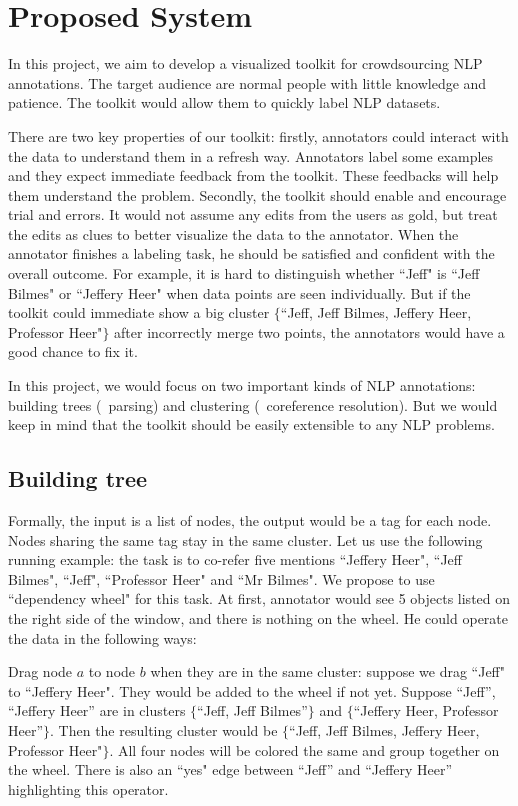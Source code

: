\section{Proposed System}

In this project, we aim to develop a visualized toolkit for
crowdsourcing NLP annotations. The target audience are normal people
with little knowledge and patience. The toolkit would allow them to
quickly label NLP datasets.

There are two key properties of our toolkit: firstly, annotators could
interact with the data to understand them in a refresh way. Annotators
label some examples and they expect immediate feedback from the
toolkit. These feedbacks will help them understand the problem.
Secondly, the toolkit should enable and encourage trial and errors. It
would not assume any edits from the users as gold, but treat the edits
as clues to better visualize the data to the annotator. When the
annotator finishes a labeling task, he should be satisfied and
confident with the overall outcome. For example, it is hard to
distinguish whether ``Jeff" is ``Jeff Bilmes" or ``Jeffery Heer" when
data points are seen individually. But if the toolkit could immediate
show a big cluster $\{$``Jeff, Jeff Bilmes, Jeffery Heer, Professor
Heer"$\}$ after incorrectly merge two points, the annotators would
have a good chance to fix it.

In this project, we would focus on two important kinds of NLP
annotations: building trees (\eg\  parsing) and clustering (\eg\
coreference resolution). But we would keep in mind that the toolkit
should be easily extensible to any NLP problems. 

\subsection{Building tree}

Formally, the input is a list of nodes, the output would be a tag for
each node. Nodes sharing the same tag stay in the same cluster. Let us
use the following running example: the task is to co-refer five
mentions ``Jeffery Heer", ``Jeff Bilmes", ``Jeff", ``Professor Heer"
and ``Mr Bilmes". We propose to use ``dependency wheel" for this task.
At first, annotator would see 5 objects listed on the right side of
the window, and there is nothing on the wheel. He could operate the
data in the following ways:

Drag node $a$ to node $b$ when they are in the same cluster: suppose
we drag ``Jeff" to ``Jeffery Heer". They would be added to the wheel
if not yet. Suppose ``Jeff'', ``Jeffery Heer'' are in clusters
  $\{$``Jeff, Jeff Bilmes''$\}$ and $\{$``Jeffery Heer, Professor
  Heer''$\}$. Then the resulting cluster would be $\{$``Jeff, Jeff
  Bilmes, Jeffery Heer, Professor Heer"$\}$. All four nodes will be
  colored the same and group together on the wheel. There is also an
  ``yes" edge between ``Jeff'' and ``Jeffery Heer'' highlighting this
  operator. 

